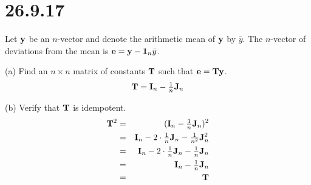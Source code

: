 \section*{26.9.17}
Let $\bf y$ be an $n$-vector and denote the arithmetic mean of $\bf y$
by $\bar y$. The $n$-vector of deviations from the mean is
${\bf e}={\bf y}-{\bf 1}_n\bar y$.

\bigskip
\noindent
(a) Find an $n\times n$ matrix of constants $\bf T$
such that ${\bf e}={\bf Ty}$.
$${\bf T}={\bf I}_n-\hbox{$1\over n$}{\bf J}_n$$

\bigskip
\noindent
(b) Verify that $\bf T$ is idempotent.
\begin{eqnarray*}
{\bf T}^2&=&({\bf I}_n-\hbox{$1\over n$}{\bf J}_n)^2\\
&=&{\bf I}_n-2\cdot\hbox{$1\over n$}{\bf J}_n-\hbox{$1\over n^2$}{\bf J}_n^2\\
&=&{\bf I}_n-2\cdot\hbox{$1\over n$}{\bf J}_n-\hbox{$1\over n$}{\bf J}_n\\
&=&{\bf I}_n-\hbox{$1\over n$}{\bf J}_n\\
&=&{\bf T}
\end{eqnarray*}
